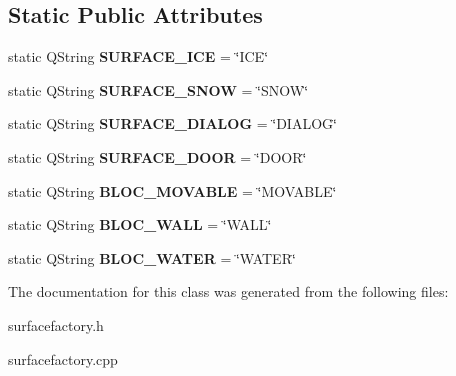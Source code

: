 \subsection*{Static Public Attributes}
\begin{DoxyCompactItemize}
\item 
\hypertarget{class_surface_factory_a7f5ea0f3cf8bba88201d500fe7de6f49}{}static Q\+String {\bfseries S\+U\+R\+F\+A\+C\+E\+\_\+\+I\+C\+E} = \char`\"{}I\+C\+E\char`\"{}\label{class_surface_factory_a7f5ea0f3cf8bba88201d500fe7de6f49}

\item 
\hypertarget{class_surface_factory_abdab35b6cc3d6b7a0e80b4e24f507ed9}{}static Q\+String {\bfseries S\+U\+R\+F\+A\+C\+E\+\_\+\+S\+N\+O\+W} = \char`\"{}S\+N\+O\+W\char`\"{}\label{class_surface_factory_abdab35b6cc3d6b7a0e80b4e24f507ed9}

\item 
\hypertarget{class_surface_factory_a48fd16f04ac1f4d29ae5a2ee2bead076}{}static Q\+String {\bfseries S\+U\+R\+F\+A\+C\+E\+\_\+\+D\+I\+A\+L\+O\+G} = \char`\"{}D\+I\+A\+L\+O\+G\char`\"{}\label{class_surface_factory_a48fd16f04ac1f4d29ae5a2ee2bead076}

\item 
\hypertarget{class_surface_factory_ac422f3d4fa87fd885c6d998705d4b7f3}{}static Q\+String {\bfseries S\+U\+R\+F\+A\+C\+E\+\_\+\+D\+O\+O\+R} = \char`\"{}D\+O\+O\+R\char`\"{}\label{class_surface_factory_ac422f3d4fa87fd885c6d998705d4b7f3}

\item 
\hypertarget{class_surface_factory_a1b0e2f8a0889c4283ab96891288b16d6}{}static Q\+String {\bfseries B\+L\+O\+C\+\_\+\+M\+O\+V\+A\+B\+L\+E} = \char`\"{}M\+O\+V\+A\+B\+L\+E\char`\"{}\label{class_surface_factory_a1b0e2f8a0889c4283ab96891288b16d6}

\item 
\hypertarget{class_surface_factory_a981e2898dcf0b45a3e7b32fced8f340f}{}static Q\+String {\bfseries B\+L\+O\+C\+\_\+\+W\+A\+L\+L} = \char`\"{}W\+A\+L\+L\char`\"{}\label{class_surface_factory_a981e2898dcf0b45a3e7b32fced8f340f}

\item 
\hypertarget{class_surface_factory_ab5cb60c5485b4f687a9c3fdef06382e0}{}static Q\+String {\bfseries B\+L\+O\+C\+\_\+\+W\+A\+T\+E\+R} = \char`\"{}W\+A\+T\+E\+R\char`\"{}\label{class_surface_factory_ab5cb60c5485b4f687a9c3fdef06382e0}

\end{DoxyCompactItemize}


The documentation for this class was generated from the following files\+:\begin{DoxyCompactItemize}
\item 
surfacefactory.\+h\item 
surfacefactory.\+cpp\end{DoxyCompactItemize}
